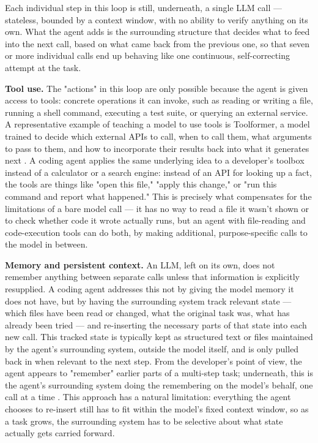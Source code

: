 Each individual step in this loop is still, underneath, a single LLM call --- stateless, bounded by a context window, with no ability to verify anything on its own. What the agent adds is the surrounding structure that decides what to feed into the next call, based on what came back from the previous one, so that seven or more individual calls end up behaving like one continuous, self-correcting attempt at the task.

\textbf{Tool use.} The "actions" in this loop are only possible because the agent is given access to tools: concrete operations it can invoke, such as reading or writing a file, running a shell command, executing a test suite, or querying an external service. A representative example of teaching a model to use tools is Toolformer, a model trained to decide which external APIs to call, when to call them, what arguments to pass to them, and how to incorporate their results back into what it generates next \cite{schick2023toolformer}. A coding agent applies the same underlying idea to a developer's toolbox instead of a calculator or a search engine: instead of an API for looking up a fact, the tools are things like "open this file," "apply this change," or "run this command and report what happened." This is precisely what compensates for the limitations of a bare model call --- it has no way to read a file it wasn't shown or to check whether code it wrote actually runs, but an agent with file-reading and code-execution tools can do both, by making additional, purpose-specific calls to the model in between.

\textbf{Memory and persistent context.} An LLM, left on its own, does not remember anything between separate calls unless that information is explicitly resupplied. A coding agent addresses this not by giving the model memory it does not have, but by having the surrounding system track relevant state --- which files have been read or changed, what the original task was, what has already been tried --- and re-inserting the necessary parts of that state into each new call. This tracked state is typically kept as structured text or files maintained by the agent's surrounding system, outside the model itself, and is only pulled back in when relevant to the next step. From the developer's point of view, the agent appears to "remember" earlier parts of a multi-step task; underneath, this is the agent's surrounding system doing the remembering on the model's behalf, one call at a time \cite{packer2023memgpt}. This approach has a natural limitation: everything the agent chooses to re-insert still has to fit within the model's fixed context window, so as a task grows, the surrounding system has to be selective about what state actually gets carried forward.

